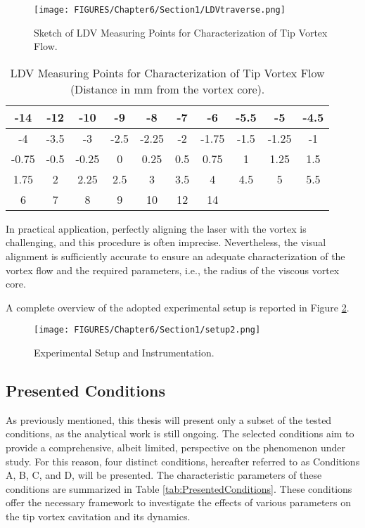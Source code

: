 \begin{figure}[h!]
    \centering
    \texttt{[image: FIGURES/Chapter6/Section1/LDVtraverse.png]}
    \caption{Sketch of LDV Measuring Points for Characterization of Tip Vortex Flow.}
    \label{fig:LDVtraverse}
\end{figure}

\begin{table}[h!]
    \centering
    \begin{tabular}{|c|c|c|c|c|c|c|c|c|c|}
        \hline
        -14 & -12 & -10 & -9 & -8 & -7 & -6 & -5.5 & -5 & -4.5 \\ \hline
        -4 & -3.5 & -3 & -2.5 & -2.25 & -2 & -1.75 & -1.5 & -1.25 & -1 \\ \hline
        -0.75 & -0.5 & -0.25 & 0 & 0.25 & 0.5 & 0.75 & 1 & 1.25 & 1.5 \\ \hline
        1.75 & 2 & 2.25 & 2.5 & 3 & 3.5 & 4 & 4.5 & 5 & 5.5 \\ \hline
        6 & 7 & 8 & 9 & 10 & 12 & 14 & & & \\ \hline
    \end{tabular}
    \caption{LDV Measuring Points for Characterization of Tip Vortex Flow (Distance in mm from the vortex core).}
    \label{tab:viscousCoreTrav}
\end{table}

In practical application, perfectly aligning the laser with the vortex is challenging, and this procedure is often imprecise. Nevertheless, the visual alignment is sufficiently accurate to ensure an adequate characterization of the vortex flow and the required parameters, i.e., the radius of the viscous vortex core.

A complete overview of the adopted experimental setup is reported in Figure \ref{fig:setup2}.

\begin{figure}[!]
    \centering
    \texttt{[image: FIGURES/Chapter6/Section1/setup2.png]}
    \caption{Experimental Setup and Instrumentation.}
    \label{fig:setup2}
\end{figure}

\subsection{Presented Conditions}
\label{sez:presCond2}

As previously mentioned, this thesis will present only a subset of the tested conditions, as the analytical work is still ongoing. The selected conditions aim to provide a comprehensive, albeit limited, perspective on the phenomenon under study.
For this reason, four distinct conditions, hereafter referred to as Conditions A, B, C, and D, will be presented. The characteristic parameters of these conditions are summarized in Table \ref{tab:PresentedConditions}. These conditions offer the necessary framework to investigate the effects of various parameters on the tip vortex cavitation and its dynamics.

